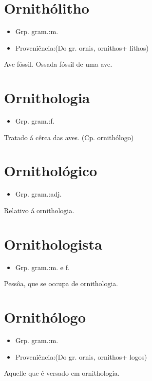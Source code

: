 \section{Ornithólitho}
\begin{itemize}
\item {Grp. gram.:m.}
\end{itemize}
\begin{itemize}
\item {Proveniência:(Do gr. \textunderscore ornis\textunderscore , \textunderscore ornithos\textunderscore  + \textunderscore lithos\textunderscore )}
\end{itemize}
Ave fóssil.
Ossada fóssil de uma ave.
\section{Ornithologia}
\begin{itemize}
\item {Grp. gram.:f.}
\end{itemize}
Tratado á cêrca das aves.
(Cp. \textunderscore ornithólogo\textunderscore )
\section{Ornithológico}
\begin{itemize}
\item {Grp. gram.:adj.}
\end{itemize}
Relativo á ornithologia.
\section{Ornithologista}
\begin{itemize}
\item {Grp. gram.:m.  e  f.}
\end{itemize}
Pessôa, que se occupa de ornithologia.
\section{Ornithólogo}
\begin{itemize}
\item {Grp. gram.:m.}
\end{itemize}
\begin{itemize}
\item {Proveniência:(Do gr. \textunderscore ornis\textunderscore , \textunderscore ornithos\textunderscore  + \textunderscore logos\textunderscore )}
\end{itemize}
Aquelle que é versado em ornithologia.
